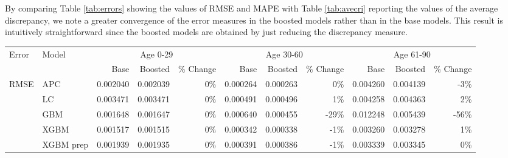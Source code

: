 \documentclass[fleqn,10pt]{wlscirep}
\begin{document}
By comparing Table \ref{tab:errors} showing the values of RMSE and MAPE with Table \ref{tab:avecri} reporting the values of the average discrepancy, we note a greater convergence of the error measures in the boosted models rather than in the base models. This result is intuitively straightforward since the boosted models are obtained by just reducing the discrepancy measure. 
%
\begin{table}[ht]
\centering
\footnotesize
\begin{tabular}{|l|l|r|r|r|r|r|r|r|r|r|}
\hline
\multirow{2}{*}{Error} & \multirow{2}{*}{Model} & \multicolumn{3}{c|}{Age 0-29} & \multicolumn{3}{c|}{Age 30-60} & \multicolumn{3}{c|}{Age 61-90} \\
\cline{3-11}
&			&	Base 	&	Boosted 	& \% Change &	Base 	&	Boosted 	& \% Change &	Base 	&	Boosted	& \% Change\\
\hline
\multirow{5}{*}{RMSE}  & APC 	&	0.002040	&	0.002039	&	0\%	&	0.000264	&	0.000263	&	0\%	&	0.004260	&	0.004139	&	-3\%	\\
& LC 	&	0.003471	&	0.003471	&	0\%	&	0.000491	&	0.000496	&	1\%	&	0.004258	&	0.004363	&	2\%	\\
& GBM 	&	0.001648	&	0.001647	&	0\%	&	0.000640	&	0.000455	&	-29\%	&	0.012248	&	0.005439	&	-56\%	\\
& XGBM 	&	0.001517	&	0.001515	&	0\%	&	0.000342	&	0.000338	&	-1\%	&	0.003260	&	0.003278	&	1\%	\\
& XGBM prep 	&	0.001939	&	0.001935	&	0\%	&	0.000391	&	0.000386	&	-1\%	&	0.003339	&	0.003345	&	0\%	\\

\end{tabular}
\end{table}
\end{document}
